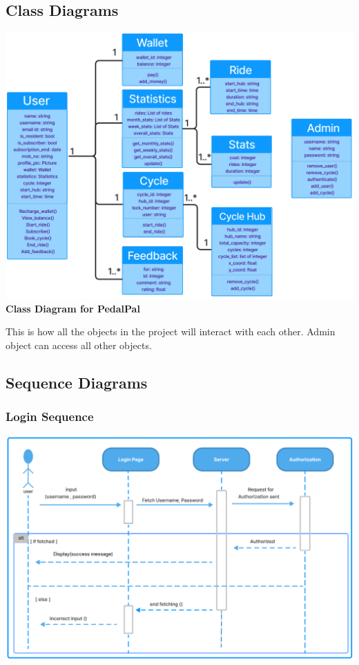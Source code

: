 \documentclass[11pt]{article}
\begin{document}
\subsection{Class Diagrams}
\begin{center}
  \includegraphics[scale=0.12]{class-diagram-images/overall.jpg}\\
  \textbf{Class Diagram for PedalPal}
\end{center}
This is how all the objects in the project will interact with each other. Admin object can access all other objects.

\subsection{Sequence Diagrams}
\subsubsection{Login Sequence}
\begin{center}
  \includegraphics[scale=0.35]{sequence-diagram-images/login.png}
\end{center}
\end{document}
